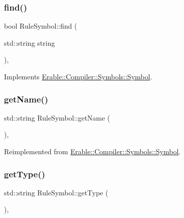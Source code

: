 \subsubsection{\texorpdfstring{find()}{find()}}
{\footnotesize\ttfamily bool Rule\+Symbol\+::find (\begin{DoxyParamCaption}\item[{std\+::string}]{string }\end{DoxyParamCaption})\hspace{0.3cm}{\ttfamily [override]}, {\ttfamily [virtual]}}



Implements \mbox{\hyperlink{class_erable_1_1_compiler_1_1_symbols_1_1_symbol_ac1d8b1392aef2e93bd47520a86f8617f}{Erable\+::\+Compiler\+::\+Symbols\+::\+Symbol}}.

\mbox{\label{class_erable_1_1_compiler_1_1_symbols_1_1_rule_symbol_a5f6cb5a2fc49bc62cc61035cc99464ca}} 
\subsubsection{\texorpdfstring{getName()}{getName()}}
{\footnotesize\ttfamily std\+::string Rule\+Symbol\+::get\+Name (\begin{DoxyParamCaption}{ }\end{DoxyParamCaption})\hspace{0.3cm}{\ttfamily [override]}, {\ttfamily [virtual]}}



Reimplemented from \mbox{\hyperlink{class_erable_1_1_compiler_1_1_symbols_1_1_symbol_a71aeae736d2ec43f0880341d53bbcc2c}{Erable\+::\+Compiler\+::\+Symbols\+::\+Symbol}}.

\mbox{\label{class_erable_1_1_compiler_1_1_symbols_1_1_rule_symbol_a83de7b4d8a52eb6da9298fb19f020d49}} 
\subsubsection{\texorpdfstring{getType()}{getType()}}
{\footnotesize\ttfamily std\+::string Rule\+Symbol\+::get\+Type (\begin{DoxyParamCaption}{ }\end{DoxyParamCaption})\hspace{0.3cm}{\ttfamily [override]}, {\ttfamily [virtual]}}



